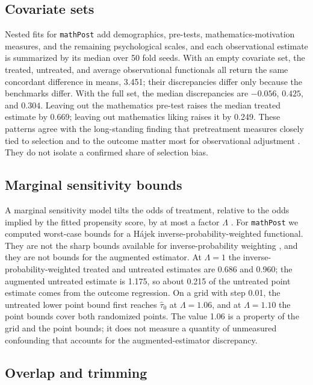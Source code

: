 \documentclass[twoside,11pt]{article}
\begin{document}
\subsection{Covariate sets}

Nested fits for \texttt{mathPost} add demographics, pre-tests, mathematics-motivation measures, and the remaining psychological scales, and each observational estimate is summarized by its median over 50 fold seeds. With an empty covariate set, the treated, untreated, and average observational functionals all return the same concordant difference in means, 3.451; their discrepancies differ only because the benchmarks differ. With the full set, the median discrepancies are $-0.056$, $0.425$, and $0.304$. Leaving out the mathematics pre-test raises the median treated estimate by 0.669; leaving out mathematics liking raises it by 0.249. These patterns agree with the long-standing finding that pretreatment measures closely tied to selection and to the outcome matter most for observational adjustment \citep{steiner2010}. They do not isolate a confirmed share of selection bias.

\subsection{Marginal sensitivity bounds}

A marginal sensitivity model tilts the odds of treatment, relative to the odds implied by the fitted propensity score, by at most a factor $\Lambda$ \citep{tan2006,zhao2019}. For \texttt{mathPost} we computed worst-case bounds for a H{\'a}jek inverse-probability-weighted functional. They are not the sharp bounds available for inverse-probability weighting \citep{dorn2023}, and they are not bounds for the augmented estimator. At $\Lambda=1$ the inverse-probability-weighted treated and untreated estimates are 0.686 and 0.960; the augmented untreated estimate is 1.175, so about 0.215 of the untreated point estimate comes from the outcome regression. On a grid with step 0.01, the untreated lower point bound first reaches $\widehat\tau_0$ at $\Lambda=1.06$, and at $\Lambda=1.10$ the point bounds cover both randomized points. The value 1.06 is a property of the grid and the point bounds; it does not measure a quantity of unmeasured confounding that accounts for the augmented-estimator discrepancy.

\subsection{Overlap and trimming}
\end{document}
